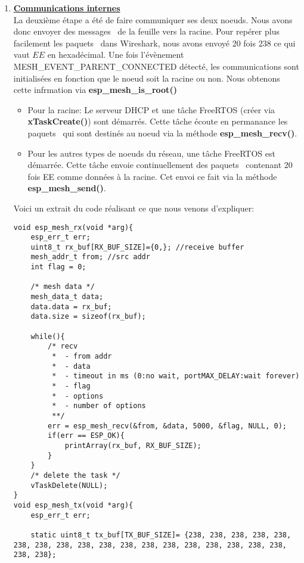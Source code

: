 \begin{enumerate}
        \item \textbf{\underline{Communications internes}}\\
            La deuxième étape a été de faire communiquer ses deux noeuds. Nous avons donc envoyer des
            messages \espmesh\ de la feuille vers la racine.
            Pour repérer plus facilement les paquets \espmesh\ dans Wireshark, nous avons envoyé
            20 fois $238$ ce qui vaut $EE$ en hexadécimal.
            Une fois l'évènement MESH\_EVENT\_PARENT\_CONNECTED détecté, les communications sont initialisées
            en fonction que le noeud soit la racine ou non. Nous obtenons cette infrmation via \textbf{{esp\_mesh\_is\_root()}}
            \begin{itemize}
                \item Pour la racine: Le serveur DHCP et une tâche FreeRTOS (créer via \textbf{{xTaskCreate()}})
                sont démarrés. Cette tâche écoute en permanance les paquets \espmesh\ qui sont destinés au noeud via la méthode
                \textbf{{esp\_mesh\_recv()}}.
                \item Pour les autres types de noeuds du réseau, une tâche FreeRTOS est démarrée. Cette tâche envoie continuellement
                des paquets \espmesh\ contenant 20 fois EE comme données à la racine. Cet envoi ce fait via la méthode
                \textbf{{esp\_mesh\_send()}}.
            \end{itemize}
            Voici un extrait du code réalisant ce que nous venons d'expliquer:
            \begin{verbatim}
void esp_mesh_rx(void *arg){
    esp_err_t err;
    uint8_t rx_buf[RX_BUF_SIZE]={0,}; //receive buffer
    mesh_addr_t from; //src addr
    int flag = 0;
    
    /* mesh data */
    mesh_data_t data;
    data.data = rx_buf;
    data.size = sizeof(rx_buf);

    while(){
        /* recv
         *  - from addr
         *  - data
         *  - timeout in ms (0:no wait, portMAX_DELAY:wait forever)
         *  - flag
         *  - options
         *  - number of options
         **/
        err = esp_mesh_recv(&from, &data, 5000, &flag, NULL, 0);
        if(err == ESP_OK){
            printArray(rx_buf, RX_BUF_SIZE);
        }
    }
    /* delete the task */
    vTaskDelete(NULL); 
}
void esp_mesh_tx(void *arg){
    esp_err_t err;

    static uint8_t tx_buf[TX_BUF_SIZE]= {238, 238, 238, 238, 238, 238, 238, 238, 238, 238, 238, 238, 238, 238, 238, 238, 238, 238, 238, 238};
    

\end{verbatim}
\end{enumerate}
